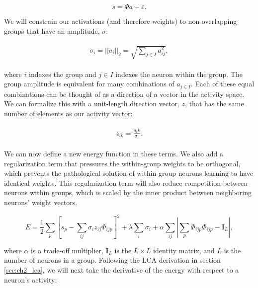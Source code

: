 \begin{equation} \label{eq:ch3_slcagenerative_model}
    s = \Phi a + \varepsilon.
\end{equation}

We will constrain our activations (and therefore weights) to non-overlapping groups that have an amplitude, $\sigma$:

\begin{align}\label{eq:ch3_a_decomp}
\begin{split}
  \sigma_{i} = ||a_{i}||_{2} = \sqrt{\sum_{j\in I}a^{2}_{ij}},
\end{split}
\end{align}

\noindent where $i$ indexes the group and $j \in I$ indexes the neuron within the group. The group amplitude is equivalent for many combinations of $a_{j \in I}$. Each of these equal combinations can be thought of as a direction of a vector in the activity space. We can formalize this with a unit-length direction vector, $z$, that has the same number of elements as our activity vector:

\begin{align}\label{eq:ch3_z_def}
\begin{split}
  z_{ik} = \frac{a_ik}{\sigma_{i}}.
\end{split}
\end{align}

We can now define a new energy function in these terms. We also add a regularization term that pressures the within-group weights to be orthogonal, which prevents the pathological solution of within-group neurons learning to have identical weights. This regularization term will also reduce competition between neurons within groups, which is scaled by the inner product between neighboring neurons' weight vectors.

\begin{equation}\label{eq:ch3_subspace_lca_energy}
    E = \frac{1}{2}\sum_{p}\left[s_{p} - \sum_{ij}\sigma_{i}z_{ij}\Phi_{ijp}\right]^{2} + \lambda \sum_{i}\sigma_{i} + \alpha \sum_{ij}\left|\sum_{p} \Phi_{ijp}\Phi_{ijp} - \mathbf{I}_{L} \right|,
\end{equation}

\noindent where $\alpha$ is a trade-off multiplier, $\mathbf{I}_{L}$ is the $L \times L$ identity matrix, and $L$ is the number of neurons in a group. Following the LCA derivation in section \ref{sec:ch2_lca}, we will next take the derivative of the energy with respect to a neuron's activity:

